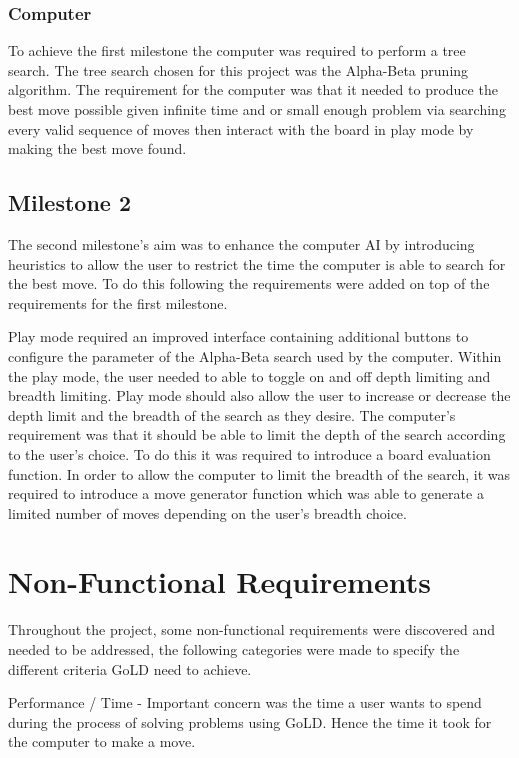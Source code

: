\documentclass{l4proj}
\begin{document}
\subsubsection{Computer}
To achieve the first milestone the computer was required to perform a tree search. The tree search chosen for this project was the Alpha-Beta pruning algorithm. The requirement for the computer was that it needed to produce the best move possible given infinite time and or small enough problem via searching every valid sequence of moves then interact with the board in play mode by making the best move found.

\subsection{Milestone 2}
The second milestone’s aim was to enhance the computer AI by introducing heuristics to allow the user to restrict the time the computer is able to search for the best move. To do this following the requirements were added on top of the requirements for the first milestone.

Play mode required an improved interface containing additional buttons to configure the parameter of the Alpha-Beta search used by the computer. Within the play mode, the user needed to able to toggle on and off depth limiting and breadth limiting. Play mode should also allow the user to increase or decrease the depth limit and the breadth of the search as they desire.
The computer’s requirement was that it should be able to limit the depth of the search according to the user’s choice. To do this it was required to introduce a board evaluation function. In order to allow the computer to limit the breadth of the search, it was required to introduce a move generator function which was able to generate a limited number of moves depending on the user’s breadth choice.

\section{Non-Functional Requirements}
Throughout the project, some non-functional requirements were discovered and needed to be addressed, the following categories were made to specify the different criteria GoLD need to achieve.

Performance / Time - Important concern was the time a user wants to spend during the process of solving problems using GoLD. Hence the time it took for the computer to make a move.
\end{document}

